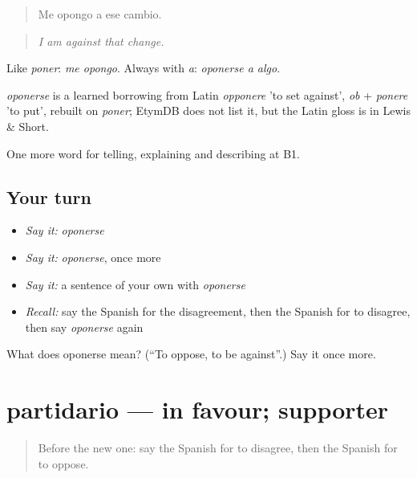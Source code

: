 \begin{quote}
Me opongo a ese cambio.
\end{quote}

\begin{quote}
\emph{I am against that change.}
\end{quote}

Like \emph{poner}: \emph{me opongo}. Always with \emph{a}: \emph{oponerse a algo}.

\begin{cousinweb}
\emph{oponerse} is a learned borrowing from Latin \emph{opponere} 'to set against', \emph{ob} + \emph{ponere} 'to put', rebuilt on \emph{poner}; EtymDB does not list it, but the Latin gloss is in Lewis \& Short.
\end{cousinweb}

\begin{grammarlens}[title={What you've built}]
One more word for telling, explaining and describing at B1.
\end{grammarlens}

\subsection*{Your turn}
\begin{itemize}
\raggedright
  \item \emph{Say it:} \emph{oponerse}
  \item \emph{Say it:} \emph{oponerse}, once more
  \item \emph{Say it:} a sentence of your own with \emph{oponerse}
  \item \emph{Recall:} say the Spanish for the disagreement, then the Spanish for to disagree, then say \emph{oponerse} again
\end{itemize}

\begin{tcolorbox}[breakable,colback=teal!4,colframe=teal!35!black,title={Before you move on}]
What does oponerse mean? (\textquotedblleft{}To oppose, to be against\textquotedblright{}.) Say it once more.
\end{tcolorbox}
\section[partidario]{partidario — in favour; supporter}

\label{lesson:ES-C578-partidario}



\begin{quote}
Before the new one: say the Spanish for to disagree, then the Spanish for to oppose.
\end{quote}

